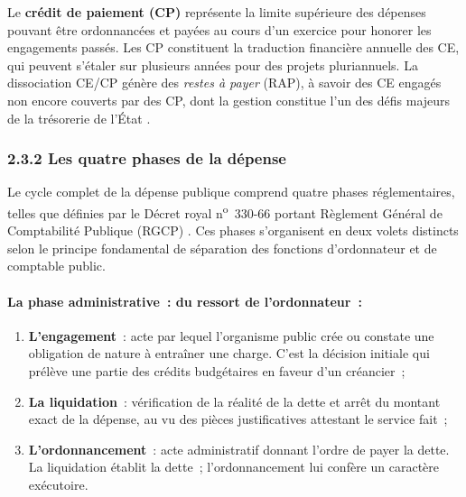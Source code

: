 Le \textbf{cr\'edit de paiement (CP)} repr\'esente la limite sup\'erieure des d\'epenses pouvant \^etre ordonnanc\'ees et pay\'ees au cours d'un exercice pour honorer les engagements pass\'es. Les CP constituent la traduction financi\`ere annuelle des CE, qui peuvent s'\'etaler sur plusieurs ann\'ees pour des projets pluriannuels. La dissociation CE/CP g\'en\`ere des \textit{restes \`a payer} (RAP), \`a savoir des CE engag\'es non encore couverts par des CP, dont la gestion constitue l'un des d\'efis majeurs de la tr\'esorerie de l'\'Etat \citep{Bouvier2020}.

\subsubsection*{2.3.2 \quad Les quatre phases de la d\'epense}

Le cycle complet de la d\'epense publique comprend quatre phases r\'eglementaires, telles que d\'efinies par le D\'ecret royal n\textsuperscript{o}~330-66 portant R\`eglement G\'en\'eral de Comptabilit\'e Publique (RGCP) \citep{RGCP1967}. Ces phases s'organisent en deux volets distincts selon le principe fondamental de s\'eparation des fonctions d'ordonnateur et de comptable public.

\paragraph{La phase administrative~: du ressort de l'ordonnateur~:}

\begin{enumerate}
    \item \textbf{L'engagement}~: acte par lequel l'organisme public cr\'ee ou constate une obligation de nature \`a entra\^iner une charge. C'est la d\'ecision initiale qui pr\'el\`eve une partie des cr\'edits budg\'etaires en faveur d'un cr\'eancier~;
    \item \textbf{La liquidation}~: v\'erification de la r\'ealit\'e de la dette et arr\^et du montant exact de la d\'epense, au vu des pi\`eces justificatives attestant le service fait~;
    \item \textbf{L'ordonnancement}~: acte administratif donnant l'ordre de payer la dette. La liquidation \'etablit la dette~; l'ordonnancement lui conf\`ere un caract\`ere ex\'ecutoire.
\end{enumerate}

